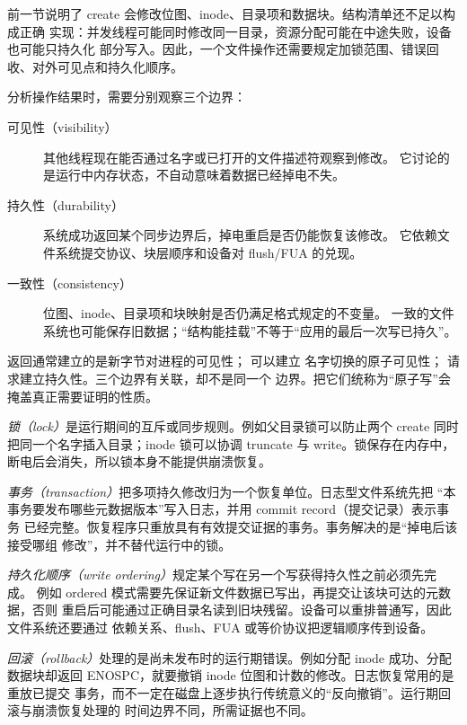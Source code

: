 
前一节说明了 create 会修改位图、inode、目录项和数据块。结构清单还不足以构成正确
实现：并发线程可能同时修改同一目录，资源分配可能在中途失败，设备也可能只持久化
部分写入。因此，一个文件操作还需要规定加锁范围、错误回收、对外可见点和持久化顺序。


分析操作结果时，需要分别观察三个边界：

\begin{description}
\item[可见性（visibility）] 其他线程现在能否通过名字或已打开的文件描述符观察到修改。
  它讨论的是运行中内存状态，不自动意味着数据已经掉电不失。
\item[持久性（durability）] 系统成功返回某个同步边界后，掉电重启是否仍能恢复该修改。
  它依赖文件系统提交协议、块层顺序和设备对 flush/FUA 的兑现。
\item[一致性（consistency）] 位图、inode、目录项和块映射是否仍满足格式规定的不变量。
  一致的文件系统也可能保存旧数据；“结构能挂载”不等于“应用的最后一次写已持久”。
\end{description}

 返回通常建立的是新字节对进程的可见性； 可以建立
名字切换的原子可见性； 请求建立持久性。三个边界有关联，却不是同一个
边界。把它们统称为“原子写”会掩盖真正需要证明的性质。


\emph{锁（lock）}是运行期间的互斥或同步规则。例如父目录锁可以防止两个 create
同时把同一个名字插入目录；inode 锁可以协调 truncate 与 write。锁保存在内存中，
断电后会消失，所以锁本身不能提供崩溃恢复。

\emph{事务（transaction）}把多项持久修改归为一个恢复单位。日志型文件系统先把
“本事务要发布哪些元数据版本”写入日志，并用 commit record（提交记录）表示事务
已经完整。恢复程序只重放具有有效提交证据的事务。事务解决的是“掉电后该接受哪组
修改”，并不替代运行中的锁。

\emph{持久化顺序（write ordering）}规定某个写在另一个写获得持久性之前必须先完成。
例如 ordered 模式需要先保证新文件数据已写出，再提交让该块可达的元数据，否则
重启后可能通过正确目录名读到旧块残留。设备可以重排普通写，因此文件系统还要通过
依赖关系、flush、FUA 或等价协议把逻辑顺序传到设备。

\emph{回滚（rollback）}处理的是尚未发布时的运行期错误。例如分配 inode 成功、分配
数据块却返回 ENOSPC，就要撤销 inode 位图和计数的修改。日志恢复常用的是重放已提交
事务，而不一定在磁盘上逐步执行传统意义的“反向撤销”。运行期回滚与崩溃恢复处理的
时间边界不同，所需证据也不同。

